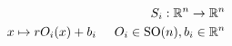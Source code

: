 \documentclass[preview]{standalone}
\begin{document}
\begin{align*}
S_i : \mathbb{R}^n \to \mathbb{R}^n \\ x \mapsto r O_i(x) + b_i\hspace{0.5 cm} O_i \in \text{SO}(n), b_i \in \mathbb{R}^n \\
\end{align*}
\end{document}
